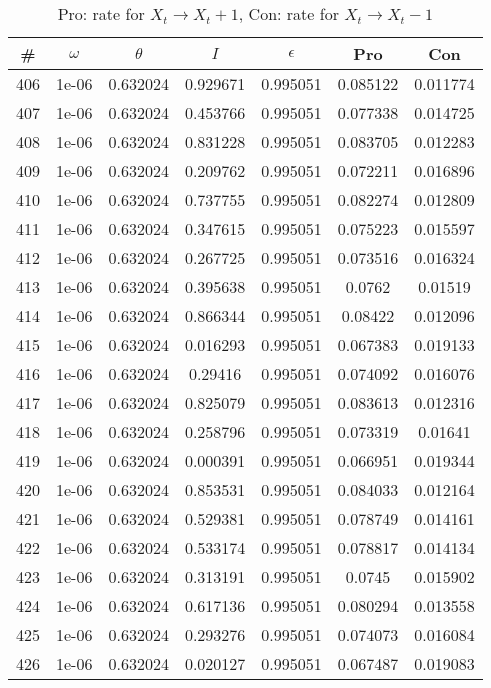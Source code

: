 \newpage
\begin{table}
\caption{Pro: rate for $X_t \rightarrow X_t + 1$, Con: rate for $X_t \rightarrow X_t - 1$}
\begin{tabular*}{\linewidth}{c|c|c|c|c|c|c}
\# & $\omega$ & $\theta$ & $I$ & $\epsilon$ & Pro & Con \\
\hline
406 & 1e-06 & 0.632024 & 0.929671 & 0.995051 & 0.085122 & 0.011774\\
407 & 1e-06 & 0.632024 & 0.453766 & 0.995051 & 0.077338 & 0.014725\\
408 & 1e-06 & 0.632024 & 0.831228 & 0.995051 & 0.083705 & 0.012283\\
409 & 1e-06 & 0.632024 & 0.209762 & 0.995051 & 0.072211 & 0.016896\\
410 & 1e-06 & 0.632024 & 0.737755 & 0.995051 & 0.082274 & 0.012809\\
411 & 1e-06 & 0.632024 & 0.347615 & 0.995051 & 0.075223 & 0.015597\\
412 & 1e-06 & 0.632024 & 0.267725 & 0.995051 & 0.073516 & 0.016324\\
413 & 1e-06 & 0.632024 & 0.395638 & 0.995051 & 0.0762 & 0.01519\\
414 & 1e-06 & 0.632024 & 0.866344 & 0.995051 & 0.08422 & 0.012096\\
415 & 1e-06 & 0.632024 & 0.016293 & 0.995051 & 0.067383 & 0.019133\\
416 & 1e-06 & 0.632024 & 0.29416 & 0.995051 & 0.074092 & 0.016076\\
417 & 1e-06 & 0.632024 & 0.825079 & 0.995051 & 0.083613 & 0.012316\\
418 & 1e-06 & 0.632024 & 0.258796 & 0.995051 & 0.073319 & 0.01641\\
419 & 1e-06 & 0.632024 & 0.000391 & 0.995051 & 0.066951 & 0.019344\\
420 & 1e-06 & 0.632024 & 0.853531 & 0.995051 & 0.084033 & 0.012164\\
421 & 1e-06 & 0.632024 & 0.529381 & 0.995051 & 0.078749 & 0.014161\\
422 & 1e-06 & 0.632024 & 0.533174 & 0.995051 & 0.078817 & 0.014134\\
423 & 1e-06 & 0.632024 & 0.313191 & 0.995051 & 0.0745 & 0.015902\\
424 & 1e-06 & 0.632024 & 0.617136 & 0.995051 & 0.080294 & 0.013558\\
425 & 1e-06 & 0.632024 & 0.293276 & 0.995051 & 0.074073 & 0.016084\\
426 & 1e-06 & 0.632024 & 0.020127 & 0.995051 & 0.067487 & 0.019083\\

\end{tabular*}
\end{table}
